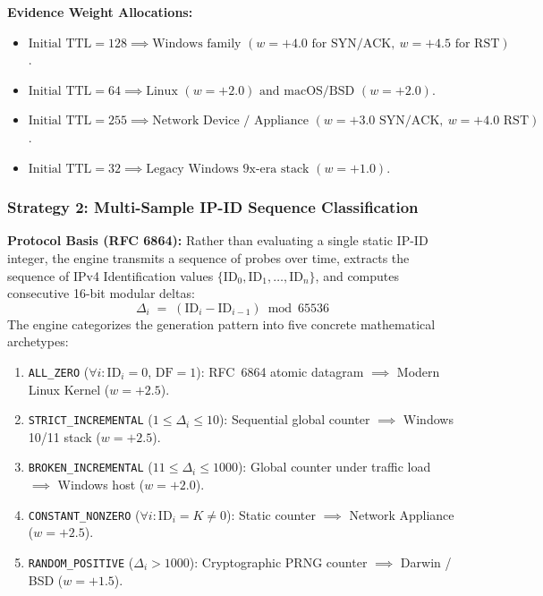 \textbf{Evidence Weight Allocations:}
\begin{itemize}
    \item $\text{Initial TTL} = 128 \implies \text{Windows family } (w = +4.0 \text{ for SYN/ACK}, \ w = +4.5 \text{ for RST})$.
    \item $\text{Initial TTL} = 64 \implies \text{Linux } (w = +2.0) \text{ and } \text{macOS/BSD } (w = +2.0)$.
    \item $\text{Initial TTL} = 255 \implies \text{Network Device / Appliance } (w = +3.0 \text{ SYN/ACK}, \ w = +4.0 \text{ RST})$.
    \item $\text{Initial TTL} = 32 \implies \text{Legacy Windows 9x-era stack } (w = +1.0)$.
\end{itemize}

\subsubsection{Strategy 2: Multi-Sample IP-ID Sequence Classification}
\textbf{Protocol Basis (RFC 6864):} Rather than evaluating a single static IP-ID integer, the engine
transmits a sequence of probes over time, extracts the sequence of IPv4 Identification values
$\{\mathrm{ID}_0, \mathrm{ID}_1, \ldots, \mathrm{ID}_n\}$, and computes consecutive 16-bit modular deltas:
\begin{equation}
\Delta_i \;=\; (\mathrm{ID}_i - \mathrm{ID}_{i-1}) \bmod 65536
\end{equation}
The engine categorizes the generation pattern into five concrete mathematical archetypes:
\begin{enumerate}
    \item \texttt{ALL\_ZERO} ($\forall i: \mathrm{ID}_i = 0$, $\text{DF}=1$): RFC~6864 atomic datagram $\implies$ Modern Linux Kernel ($w = +2.5$).
    \item \texttt{STRICT\_INCREMENTAL} ($1 \le \Delta_i \le 10$): Sequential global counter $\implies$ Windows 10/11 stack ($w = +2.5$).
    \item \texttt{BROKEN\_INCREMENTAL} ($11 \le \Delta_i \le 1000$): Global counter under traffic load $\implies$ Windows host ($w = +2.0$).
    \item \texttt{CONSTANT\_NONZERO} ($\forall i: \mathrm{ID}_i = K \ne 0$): Static counter $\implies$ Network Appliance ($w = +2.5$).
    \item \texttt{RANDOM\_POSITIVE} ($\Delta_i > 1000$): Cryptographic PRNG counter $\implies$ Darwin / BSD ($w = +1.5$).
\end{enumerate}

